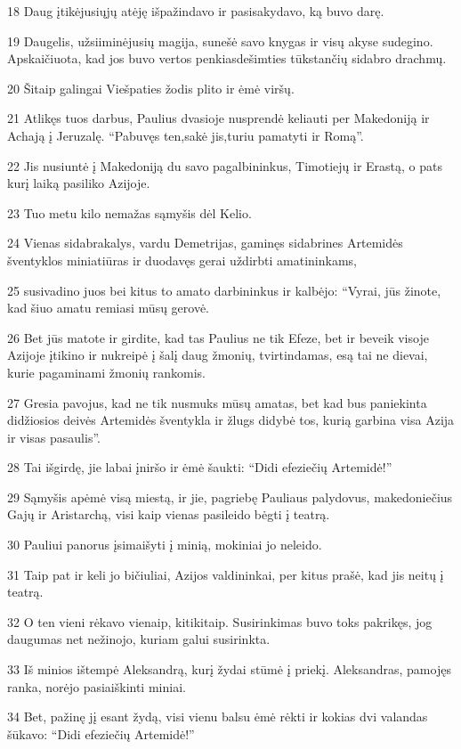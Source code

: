 \par 18 Daug įtikėjusiųjų atėję išpažindavo ir pasisakydavo, ką buvo darę. 
\par 19 Daugelis, užsiiminėjusių magija, sunešė savo knygas ir visų akyse sudegino. Apskaičiuota, kad jos buvo vertos penkiasdešimties tūkstančių sidabro drachmų. 
\par 20 Šitaip galingai Viešpaties žodis plito ir ėmė viršų. 
\par 21 Atlikęs tuos darbus, Paulius dvasioje nusprendė keliauti per Makedoniją ir Achają į Jeruzalę. “Pabuvęs ten,­sakė jis,­turiu pamatyti ir Romą”. 
\par 22 Jis nusiuntė į Makedoniją du savo pagalbininkus, Timotiejų ir Erastą, o pats kurį laiką pasiliko Azijoje. 
\par 23 Tuo metu kilo nemažas sąmyšis dėl Kelio. 
\par 24 Vienas sidabrakalys, vardu Demetrijas, gaminęs sidabrines Artemidės šventyklos miniatiūras ir duodavęs gerai uždirbti amatininkams, 
\par 25 susivadino juos bei kitus to amato darbininkus ir kalbėjo: “Vyrai, jūs žinote, kad šiuo amatu remiasi mūsų gerovė. 
\par 26 Bet jūs matote ir girdite, kad tas Paulius ne tik Efeze, bet ir beveik visoje Azijoje įtikino ir nukreipė į šalį daug žmonių, tvirtindamas, esą tai ne dievai, kurie pagaminami žmonių rankomis. 
\par 27 Gresia pavojus, kad ne tik nusmuks mūsų amatas, bet kad bus paniekinta didžiosios deivės Artemidės šventykla ir žlugs didybė tos, kurią garbina visa Azija ir visas pasaulis”. 
\par 28 Tai išgirdę, jie labai įniršo ir ėmė šaukti: “Didi efeziečių Artemidė!” 
\par 29 Sąmyšis apėmė visą miestą, ir jie, pagriebę Pauliaus palydovus, makedoniečius Gajų ir Aristarchą, visi kaip vienas pasileido bėgti į teatrą. 
\par 30 Pauliui panorus įsimaišyti į minią, mokiniai jo neleido. 
\par 31 Taip pat ir keli jo bičiuliai, Azijos valdininkai, per kitus prašė, kad jis neitų į teatrą. 
\par 32 O ten vieni rėkavo vienaip, kiti­kitaip. Susirinkimas buvo toks pakrikęs, jog daugumas net nežinojo, kuriam galui susirinkta. 
\par 33 Iš minios ištempė Aleksandrą, kurį žydai stūmė į priekį. Aleksandras, pamojęs ranka, norėjo pasiaiškinti miniai. 
\par 34 Bet, pažinę jį esant žydą, visi vienu balsu ėmė rėkti ir kokias dvi valandas šūkavo: “Didi efeziečių Artemidė!” 
